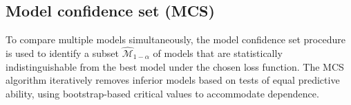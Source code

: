 \documentclass[12pt]{report}
\begin{document}
\subsection{Model confidence set (MCS)}

To compare multiple models simultaneously, the model confidence set procedure is used to identify a subset $\widehat{\mathcal{M}}_{1-\alpha}$ of models that are statistically indistinguishable from the best model under the chosen loss function. The MCS algorithm iteratively removes inferior models based on tests of equal predictive ability, using bootstrap-based critical values to accommodate dependence.





\end{document}
